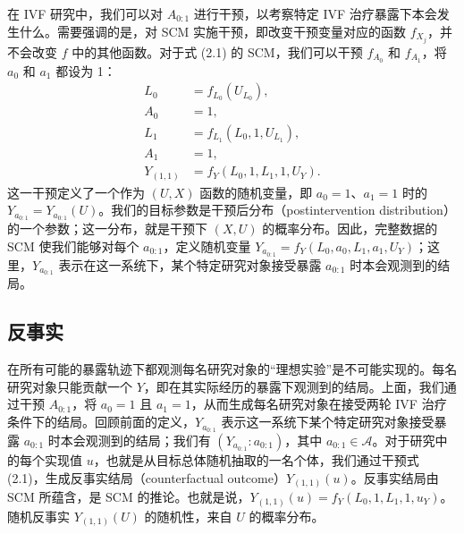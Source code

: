 在 IVF 研究中，我们可以对 $A_{0:1}$ 进行干预，以考察特定 IVF 治疗暴露下本会发生什么。需要强调的是，对 SCM 实施干预，即改变干预变量对应的函数 $f_{X_j}$，并不会改变 $f$ 中的其他函数。对于式 (2.1) 的 SCM，我们可以干预 $f_{A_0}$ 和 $f_{A_1}$，将 $a_0$ 和 $a_1$ 都设为 1：
\[
 \begin{aligned}
 L_0&=f_{L_0}(U_{L_0}),\\
 A_0&=1,\\
 L_1&=f_{L_1}(L_0,1,U_{L_1}),\\
 A_1&=1,\\
 Y_{(1,1)}&=f_Y(L_0,1,L_1,1,U_Y).
 \end{aligned}
\]
这一干预定义了一个作为 $(U,X)$ 函数的随机变量，即 $a_0=1$、$a_1=1$ 时的 $Y_{a_{0:1}}=Y_{a_{0:1}}(U)$。我们的目标参数是干预后分布（postintervention distribution）的一个参数；这一分布，就是干预下 $(X,U)$ 的概率分布。因此，完整数据的 SCM 使我们能够对每个 $a_{0:1}$，定义随机变量 $Y_{a_{0:1}}=f_Y(L_0,a_0,L_1,a_1,U_Y)$；这里，$Y_{a_{0:1}}$ 表示在这一系统下，某个特定研究对象接受暴露 $a_{0:1}$ 时本会观测到的结局。

\subsection{反事实}
\label{subsec:ch02-counterfactuals}

在所有可能的暴露轨迹下都观测每名研究对象的“理想实验”是不可能实现的。每名研究对象只能贡献一个 $Y$，即在其实际经历的暴露下观测到的结局。上面，我们通过干预 $A_{0:1}$，将 $a_0=1$ 且 $a_1=1$，从而生成每名研究对象在接受两轮 IVF 治疗条件下的结局。回顾前面的定义，$Y_{a_{0:1}}$ 表示这一系统下某个特定研究对象接受暴露 $a_{0:1}$ 时本会观测到的结局；我们有 $(Y_{a_{0:1}}:a_{0:1})$，其中 $a_{0:1}\in\mathcal A$。对于研究中的每个实现值 $u$，也就是从目标总体随机抽取的一名个体，我们通过干预式 (2.1)，生成反事实结局（counterfactual outcome）$Y_{(1,1)}(u)$。反事实结局由 SCM 所蕴含，是 SCM 的推论。也就是说，$Y_{(1,1)}(u)=f_Y(L_0,1,L_1,1,u_Y)$。随机反事实 $Y_{(1,1)}(U)$ 的随机性，来自 $U$ 的概率分布。
